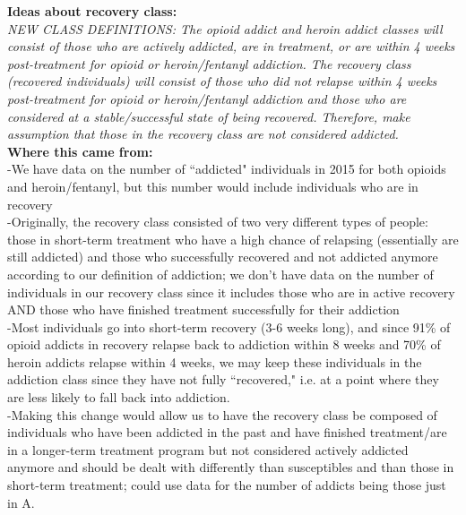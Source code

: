 \documentclass[12pt]{article}
\begin{document}
\noindent \textbf{Ideas about recovery class:} \\ 

\textit{NEW CLASS DEFINITIONS: The opioid addict and heroin addict classes will consist of those who are actively addicted, are in treatment, or are within 4 weeks post-treatment for opioid or heroin/fentanyl addiction. The recovery class (recovered individuals) will consist of those who did not relapse within 4 weeks post-treatment for opioid or heroin/fentanyl addiction and those who are considered at a stable/successful state of being recovered. Therefore, make assumption that those in the recovery class are not considered addicted.}\\

\textbf{Where this came from:} \\
-We have data on the number of ``addicted" individuals in 2015 for both opioids and heroin/fentanyl, but  this number would include individuals who are in recovery \\
-Originally, the recovery class consisted of two very different types of people: those in short-term treatment who have a high chance of relapsing (essentially are still addicted) and those who successfully recovered and not addicted anymore according to our definition of addiction; we don't have data on the number of individuals in our recovery class since it includes those who are in active recovery AND those who have finished treatment successfully for their addiction \\
-Most individuals go into short-term recovery (3-6 weeks long), and since 91\% of opioid addicts in recovery relapse back to addiction within 8 weeks and 70\% of heroin addicts relapse within 4 weeks, we may keep these individuals in the addiction class since they have not fully ``recovered," i.e. at a point where they are less likely to fall back into addiction. \cite{NIH4, SAMSHA4} \\
-Making this change would allow us to have the recovery class be composed of individuals who have been addicted in the past and have finished treatment/are in a longer-term treatment program but not considered actively addicted anymore and should be dealt with differently than susceptibles and than those in short-term treatment; could use data for the number of addicts being those just in A. \\ \\


\end{document}
